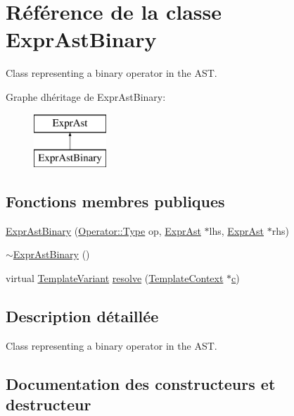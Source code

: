 \hypertarget{class_expr_ast_binary}{}\section{Référence de la classe Expr\+Ast\+Binary}
\label{class_expr_ast_binary}


Class representing a binary operator in the A\+S\+T.  


Graphe d\textquotesingle{}héritage de Expr\+Ast\+Binary\+:\begin{figure}[H]
\begin{center}
\leavevmode
\includegraphics[height=2.000000cm]{class_expr_ast_binary}
\end{center}
\end{figure}
\subsection*{Fonctions membres publiques}
\begin{DoxyCompactItemize}
\item 
\hyperlink{class_expr_ast_binary_a80a29a859ce16fb7cbf1dace940a8f5b}{Expr\+Ast\+Binary} (\hyperlink{class_operator_adf562143104191264da67b4e6e1a1644}{Operator\+::\+Type} op, \hyperlink{class_expr_ast}{Expr\+Ast} $\ast$lhs, \hyperlink{class_expr_ast}{Expr\+Ast} $\ast$rhs)
\item 
\hyperlink{class_expr_ast_binary_ad9ce0008988ea79f47b920a27583e9ff}{$\sim$\+Expr\+Ast\+Binary} ()
\item 
virtual \hyperlink{class_template_variant}{Template\+Variant} \hyperlink{class_expr_ast_binary_a1061c5601a23daeba8a9fed7bc1e33b4}{resolve} (\hyperlink{class_template_context}{Template\+Context} $\ast$\hyperlink{060__command__switch_8tcl_ab14f56bc3bd7680490ece4ad7815465f}{c})
\end{DoxyCompactItemize}


\subsection{Description détaillée}
Class representing a binary operator in the A\+S\+T. 

\subsection{Documentation des constructeurs et destructeur}
\hypertarget{class_expr_ast_binary_a80a29a859ce16fb7cbf1dace940a8f5b}{}
